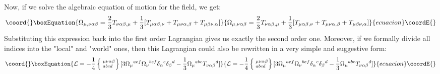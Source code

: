 \documentclass[a4paper,12pt]{article}
\begin{document}
Now, if we solve the algebraic equation of motion for the \myHighlight{$\Omega$}\coordHE{}
field, we get:
\begin{equation}\coord{}\boxEquation{
\Omega_{\mu,\nu\alpha\beta} = \frac{2}{3} T_{\nu\alpha\beta,\mu} +
\frac{1}{3} [ T_{\mu\alpha\beta,\nu} + T_{\mu\nu\alpha,\beta} +
T_{\mu\beta\nu,\alpha} ]
}{
\Omega_{\mu,\nu\alpha\beta} = \frac{2}{3} T_{\nu\alpha\beta,\mu} +
\frac{1}{3} [ T_{\mu\alpha\beta,\nu} + T_{\mu\nu\alpha,\beta} +
T_{\mu\beta\nu,\alpha} ]
}{ecuacion}\coordE{}\end{equation}
Substituting this expression back into the first order Lagrangian
gives us exactly the second order one. Moreover, if we formally
divide all indices into the "local" and "world" ones, then this
Lagrangian could also be rewritten in a very simple and suggestive
form:
\begin{equation}\coord{}\boxEquation{
{\cal L} = - \frac{1}{4} \left\{
\phantom{|}^{\mu\nu\alpha\beta}_{abcd}
\right\} [ 3 \Omega_\mu{}^{aef} \Omega_\nu{}^{bef} \delta_\alpha{}^c
\delta_\beta{}^d - \frac{1}{3} \Omega_\mu{}^{abc}
T_{\nu\alpha\beta}{}^d ]
}{
{\cal L} = - \frac{1}{4} \left\{
\phantom{|}^{\mu\nu\alpha\beta}_{abcd}
\right\} [ 3 \Omega_\mu{}^{aef} \Omega_\nu{}^{bef} \delta_\alpha{}^c
\delta_\beta{}^d - \frac{1}{3} \Omega_\mu{}^{abc}
T_{\nu\alpha\beta}{}^d ]
}{ecuacion}\coordE{}\end{equation}
\end{document}
